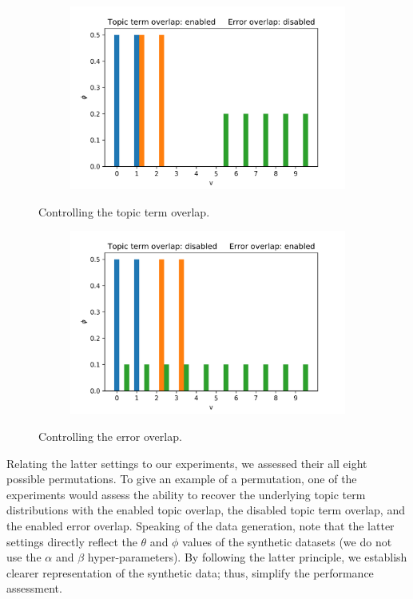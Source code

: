 \documentclass{mpaper}
\begin{document}
\begin{figure}
  \begin{subfigure}[b]{0.48\textwidth}
    \includegraphics[width=\linewidth]{phi_topic-ol_error-nonol.png}
  \end{subfigure}%
   \caption{Controlling the topic term overlap.}
  \label{fig:ol_terms}

  \begin{subfigure}[b]{0.48\textwidth}
    \includegraphics[width=\linewidth]{phi_topic-nonol_error-ol.png}
  \end{subfigure}%
   \caption{Controlling the error overlap.}
  \label{fig:ol_error}
\end{figure}

\par Relating the latter settings to our experiments, we assessed their all eight possible permutations. To give an example of a permutation, one of the experiments would assess the ability to recover the underlying topic term distributions with the enabled topic overlap, the disabled topic term overlap, and the enabled error overlap. Speaking of the data generation, note that the latter settings directly reflect the $\theta$ and $\phi$ values of the synthetic datasets (we do not use the $\alpha$ and $\beta$ hyper-parameters). By following the latter principle, we establish clearer representation of the synthetic data; thus, simplify the performance assessment.
\end{document}
